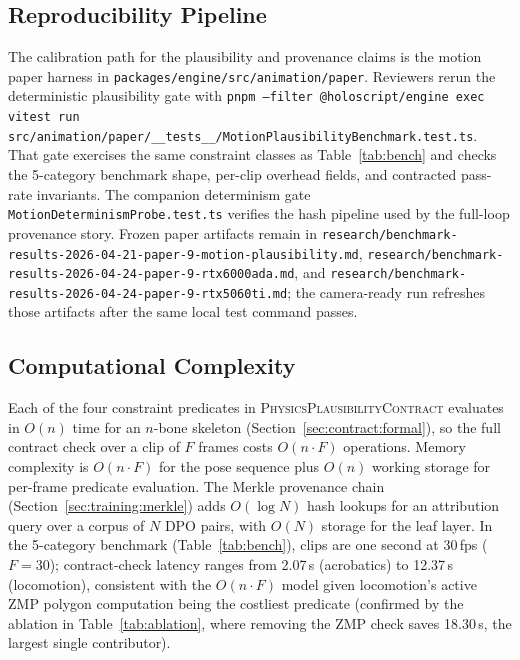 \documentclass[sigconf,nonacm]{acmart}
\newcommand{\plausibility}{\textsc{PhysicsPlausibilityContract}}
\begin{document}
\subsection{Reproducibility Pipeline}
\label{sec:repro-pipeline}

The calibration path for the plausibility and provenance claims is the motion
paper harness in \texttt{packages/engine/src/animation/paper}. Reviewers rerun
the deterministic plausibility gate with
\texttt{pnpm --filter @holoscript/engine exec vitest run src/animation/paper/\_\_tests\_\_/MotionPlausibilityBenchmark.test.ts}.
That gate exercises the same constraint classes as Table~\ref{tab:bench} and
checks the 5-category benchmark shape, per-clip overhead fields, and contracted
pass-rate invariants. The companion determinism gate
\texttt{MotionDeterminismProbe.test.ts} verifies the hash pipeline used by the
full-loop provenance story. Frozen paper artifacts remain in
\texttt{research/benchmark-results-2026-04-21-paper-9-motion-plausibility.md},
\texttt{research/benchmark-results-2026-04-24-paper-9-rtx6000ada.md}, and
\texttt{research/benchmark-results-2026-04-24-paper-9-rtx5060ti.md}; the
camera-ready run refreshes those artifacts after the same local test command
passes.

\subsection{Computational Complexity}
\label{sec:complexity}

Each of the four constraint predicates in \plausibility{} evaluates in $O(n)$
time for an $n$-bone skeleton (Section~\ref{sec:contract:formal}), so the
full contract check over a clip of $F$ frames costs $O(n \cdot F)$ operations.
Memory complexity is $O(n \cdot F)$ for the pose sequence plus $O(n)$ working
storage for per-frame predicate evaluation. The Merkle provenance chain
(Section~\ref{sec:training:merkle}) adds $O(\log N)$ hash lookups for an
attribution query over a corpus of $N$ DPO pairs, with $O(N)$ storage for
the leaf layer. In the 5-category benchmark (Table~\ref{tab:bench}), clips
are one second at 30\,fps ($F = 30$); contract-check latency ranges from
2.07\,\textmu{}s (acrobatics) to 12.37\,\textmu{}s (locomotion), consistent
with the $O(n \cdot F)$ model given locomotion's active ZMP polygon computation
being the costliest predicate (confirmed by the ablation in Table~\ref{tab:ablation},
where removing the ZMP check saves 18.30\,\textmu{}s, the largest single
contributor).
\end{document}
